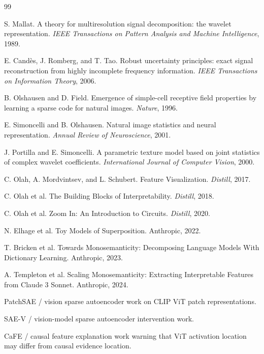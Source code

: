 \documentclass[11pt]{article}
\begin{document}
\begin{thebibliography}{99}

S. Mallat.
A theory for multiresolution signal decomposition: the wavelet representation.
\emph{IEEE Transactions on Pattern Analysis and Machine Intelligence}, 1989.

E. Cand\`es, J. Romberg, and T. Tao.
Robust uncertainty principles: exact signal reconstruction from highly incomplete frequency information.
\emph{IEEE Transactions on Information Theory}, 2006.

B. Olshausen and D. Field.
Emergence of simple-cell receptive field properties by learning a sparse code for natural images.
\emph{Nature}, 1996.

E. Simoncelli and B. Olshausen.
Natural image statistics and neural representation.
\emph{Annual Review of Neuroscience}, 2001.

J. Portilla and E. Simoncelli.
A parametric texture model based on joint statistics of complex wavelet coefficients.
\emph{International Journal of Computer Vision}, 2000.

C. Olah, A. Mordvintsev, and L. Schubert.
Feature Visualization.
\emph{Distill}, 2017.

C. Olah et al.
The Building Blocks of Interpretability.
\emph{Distill}, 2018.

C. Olah et al.
Zoom In: An Introduction to Circuits.
\emph{Distill}, 2020.

N. Elhage et al.
Toy Models of Superposition.
Anthropic, 2022.

T. Bricken et al.
Towards Monosemanticity: Decomposing Language Models With Dictionary Learning.
Anthropic, 2023.

A. Templeton et al.
Scaling Monosemanticity: Extracting Interpretable Features from Claude 3 Sonnet.
Anthropic, 2024.

PatchSAE / vision sparse autoencoder work on CLIP ViT patch representations.

SAE-V / vision-model sparse autoencoder intervention work.

CaFE / causal feature explanation work warning that ViT activation location may differ from causal evidence location.

\end{thebibliography}
\end{document}
